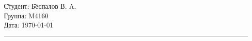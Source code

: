 \begin{tabbing}
\hspace{11cm} \= Студент: \= Беспалов В. A. \\
  \> Группа: \> M4160 \\
  \> Дата: \> \today
\end{tabbing}
\hrule
\vspace{1cm}
